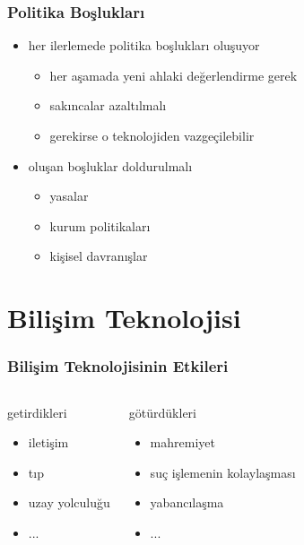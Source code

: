 \documentclass[dvipsnames]{beamer}
\theoremstyle{definition}
\theoremstyle{example}
\theoremstyle{plain}
\begin{document}
\begin{frame}
  \frametitle{Politika Boşlukları}

  \begin{itemize}
    \item her ilerlemede politika boşlukları oluşuyor
    \begin{itemize}
      \item her aşamada yeni ahlaki değerlendirme gerek
      \item sakıncalar azaltılmalı
      \item gerekirse o teknolojiden vazgeçilebilir
    \end{itemize}

    \pause
    \medskip
    \item oluşan boşluklar doldurulmalı
    \begin{itemize}
      \item yasalar
      \item kurum politikaları
      \item kişisel davranışlar
    \end{itemize}
  \end{itemize}
\end{frame}

\section{Bilişim Teknolojisi}

\begin{frame}
  \frametitle{Bilişim Teknolojisinin Etkileri}

  \begin{columns}
    \begin{block}{getirdikleri}
      \begin{itemize}
        \item iletişim
        \item tıp
        \item uzay yolculuğu
        \item ...
      \end{itemize}
    \end{block}

    \pause
    \begin{block}{götürdükleri}
      \begin{itemize}
        \item mahremiyet
        \item suç işlemenin kolaylaşması
        \item yabancılaşma
        \item ...
      \end{itemize}
    \end{block}
  \end{columns}
\end{frame}
\end{document}

